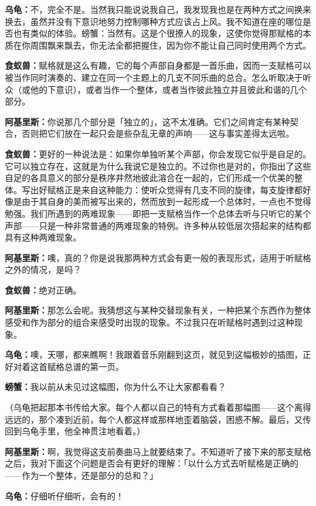 \documentclass[
  12pt,
  twoside,
  openright,
  oldfontcommands,
]{memoir}
\newcommand{\dialogname}[1]{{\heifamily\bfseries #1}}
\begin{document}
\dialogname{乌龟：}不，完全不是。当然我只能说说我自己，我发现我也是在两种方式之间换来换去，虽然并没有下意识地努力控制哪种方式应该占上风。我不知道在座的哪位是否也有类似的体验。螃蟹：当然有。这是个很撩人的现象，这使你觉得那赋格的本质在你周围飘来飘去，你无法全都把握住，因为你不能让自己同时使用两个方式。

\dialogname{食蚁兽：}赋格就是这么有趣，它的每个声部自身都是一首乐曲，因而一支赋格可以被当作同时演奏的、建立在同一个主题上的几支不同乐曲的总合。怎么听取决于听众（或他的下意识），或者当作一个整体，或者当作彼此独立并且彼此和谐的几个部分。

\dialogname{阿基里斯：}你说那几个部分是「独立的」，这不太准确。它们之间肯定有某种契合，否则把它们放在一起只会是些杂乱无章的声响------这与事实差得太远啦。

\dialogname{食蚁兽：}更好的一种说法是：如果你单独听某个声部，你会发现它似乎是自足的。它可以独立存在，这就是为什么我说它是独立的。不过你也是对的，你指出了这些自足的各具意义的部分是秩序井然地彼此溶合在一起的，它们形成一个优美的整体。写出好赋格正是来自这种能力：使听众觉得有几支不同的旋律，每支旋律都好像是由于其自身的美而被写出来的，然而放到一起形成一个总体时，一点也不觉得勉强。我们所遇到的两难现象------即把一支赋格当作一个总体去听与只听它的某个声部------只是一种非常普通的两难现象的特例。许多种从较低层次搭起来的结构都具有这种两难现象。

\dialogname{阿基里斯：}噢，真的？你是说我那两种方式会有更一般的表现形式，适用于听赋格之外的情况，是吗？

\dialogname{食蚁兽：}绝对正确。

\dialogname{阿基里斯：}那怎么会呢。我猜想这与某种交替现象有关，一种把某个东西作为整体感受和作为部分的组合来感受时出现的现象。不过我只在听赋格时遇到过这种现象。

\dialogname{乌龟：}噢，天哪，都来瞧啊！我跟着音乐刚翻到这页，就见到这幅极妙的插图，正好对着这首赋格总谱的第一页。

\dialogname{螃蟹：}我以前从未见过这幅图，你为什么不让大家都看看？

（乌龟把起那本书传给大家。每个人都以自己的特有方式看着那幅图------这个离得远远的，那个凑到近前，每个人都这样或那样地歪着脑袋，困惑不解。最后，又传回到乌龟手里，他全神贯注地看着。）

\dialogname{阿基里斯：}啊，我觉得这支前奏曲马上就要结束了。不知道听了接下来的那支赋格之后，我对下面这个问题是否会有更好的理解：「以什么方式去听赋格是正确的------作为一个整体，还是部分的总和？」

\dialogname{乌龟：}仔细听仔细听，会有的！
\end{document}
